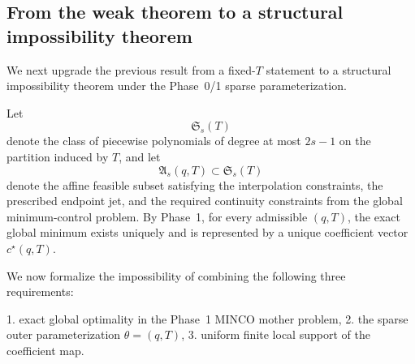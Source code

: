 \subsection{From the weak theorem to a structural impossibility theorem}
\label{subsec:phase2_strong_theorem}

We next upgrade the previous result from a fixed-\(T\) statement to a structural impossibility theorem under the Phase~0/1 sparse parameterization.

Let
\[
\mathfrak S_{s}(T)
\]
denote the class of piecewise polynomials of degree at most \(2s-1\) on the partition induced by \(T\), and let
\[
\mathfrak A_{s}(q,T)
\subset \mathfrak S_s(T)
\]
denote the affine feasible subset satisfying the interpolation constraints, the prescribed endpoint jet, and the required continuity constraints from the global minimum-control problem.
By Phase~1, for every admissible \((q,T)\), the exact global minimum exists uniquely and is represented by a unique coefficient vector \(c^\star(q,T)\).

We now formalize the impossibility of combining the following three requirements:

1. exact global optimality in the Phase~1 MINCO mother problem,
2. the sparse outer parameterization \(\theta=(q,T)\),
3. uniform finite local support of the coefficient map.

